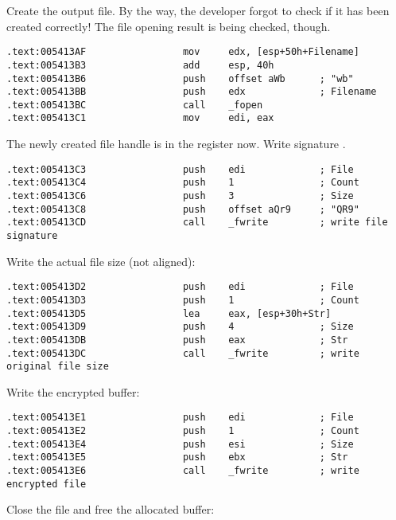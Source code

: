 Create the output file. By the way, the developer forgot to check if it has been created correctly! 
The file opening result is being checked, though.

\begin{lstlisting}[style=customasmx86]
.text:005413AF                 mov     edx, [esp+50h+Filename]
.text:005413B3                 add     esp, 40h
.text:005413B6                 push    offset aWb      ; "wb"
.text:005413BB                 push    edx             ; Filename
.text:005413BC                 call    _fopen
.text:005413C1                 mov     edi, eax
\end{lstlisting}

The newly created file handle is in the \EDI register now. Write signature .

\begin{lstlisting}[style=customasmx86]
.text:005413C3                 push    edi             ; File
.text:005413C4                 push    1               ; Count
.text:005413C6                 push    3               ; Size
.text:005413C8                 push    offset aQr9     ; "QR9"
.text:005413CD                 call    _fwrite         ; write file signature
\end{lstlisting}

Write the actual file size (not aligned):

\begin{lstlisting}[style=customasmx86]
.text:005413D2                 push    edi             ; File
.text:005413D3                 push    1               ; Count
.text:005413D5                 lea     eax, [esp+30h+Str]
.text:005413D9                 push    4               ; Size
.text:005413DB                 push    eax             ; Str
.text:005413DC                 call    _fwrite         ; write original file size
\end{lstlisting}

Write the encrypted buffer:

\begin{lstlisting}[style=customasmx86]
.text:005413E1                 push    edi             ; File
.text:005413E2                 push    1               ; Count
.text:005413E4                 push    esi             ; Size
.text:005413E5                 push    ebx             ; Str
.text:005413E6                 call    _fwrite         ; write encrypted file
\end{lstlisting}

Close the file and free the allocated buffer:


